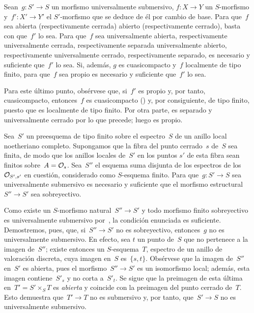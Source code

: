 \begin{proposition}
\label{IX.2.4}
Sean~$g\colon S'\to S$ un morfismo universalmente submersivo,
$f\colon X\to Y$ un $S$-morfismo y~$f'\colon X'\to Y'$ el
$S'$-morfismo que se deduce de él por cambio de base. Para que~$f$ sea
{abierta (respectivamente cerrada)}
{abierto (respectivamente cerrado)}, basta con que~$f'$ lo sea. Para que~$f$
sea 
{universalmente abierta, respectivamente universalmente cerrada,
respectivamente separada}
{universalmente abierto, respectivamente universalmente cerrado,
respectivamente separado}, es necesario y suficiente que~$f'$ lo sea. Si,
además, $g$ es cuasicompacto y~$f$ localmente de tipo finito, para que~$f$
sea propio es necesario y suficiente que~$f'$ lo sea.
\end{proposition}

Para este último punto, obsérvese que, si~$f'$ es propio y, por tanto,
cuasicompacto, entonces~$f$ es cuasicompacto () y, por
consiguiente, de tipo finito, puesto que es localmente de tipo finito. Por
otra parte, es separado y universalmente cerrado por lo que precede; luego
es propio.

\begin{proposition}
\label{IX.2.5}
Sea~$S'$ un preesquema de tipo finito sobre el espectro~$S$ de un anillo
local noetheriano completo. Supongamos que la fibra del punto cerrado~$s$
de~$S$ sea finita, de modo que los anillos locales de~$S'$ en los puntos
$s'$ de esta fibra sean finitos sobre~$A=\cal{O}_s$. Sea~$S''$ el esquema
suma disjunta de los espectros de los~$\cal{O}_{S',s'}$ en cuestión,
considerado como $S$-esquema finito. Para que~$g\colon S'\to S$ sea
universalmente submersivo es necesario y suficiente que el morfismo
estructural~$S''\to S'$ sea sobreyectivo.
\end{proposition}

Como existe un $S$-morfismo natural~$S''\to S'$ y todo morfismo finito
sobreyectivo es universalmente submersivo por~, la condición
enunciada es suficiente. Demostremos, pues, que, si~$S''\to S'$ no es
sobreyectivo, entonces~$g$ no es universalmente submersivo. En efecto, sea
$t$ un punto de~$S$ que no pertenece a la
imagen de~$S''$; existe entonces
un $S$-esquema~$T$, espectro de un anillo de valoración discreta, cuya
imagen en~$S$ es~$\{s,t\}$. Obsérvese que la imagen de~$S''$ en~$S'$ es
abierta, pues el morfismo~$S''\to S'$ es un isomorfismo local; además, esta
imagen contiene~$S'_s$ y no corta a~$S'_t$. Se sigue que la preimagen de
esta última en~$T'=S'\times_S T$ es \emph{abierta} y coincide con la
preimagen del punto cerrado de~$T$. Esto
demuestra que~$T'\to T$ no es submersivo y, por tanto, que~$S'\to S$ no es
universalmente submersivo.

